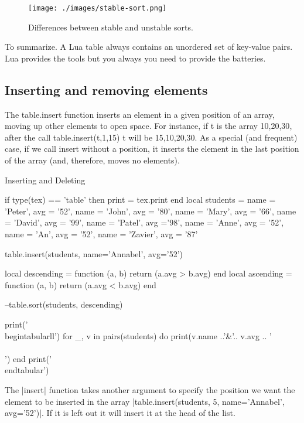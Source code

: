 \begin{figure}[htbp]
\centering

\texttt{[image: ./images/stable-sort.png]}
\caption{Differences between stable and unstable sorts.}
\end{figure}

\begin{scriptexample}{}{}
To summarize. A Lua table always contains an unordered set of key-value pairs. Lua provides the tools but you always you need to provide the batteries.
\end{scriptexample}

\subsection{Inserting and removing elements}

The table.insert function inserts an element in a given position of an array,
moving up other elements to open space. For instance, if t is the array
{10,20,30}, after the call table.insert(t,1,15) t will be {15,10,20,30}. As
a special (and frequent) case, if we call insert without a position, it inserts the
element in the last position of the array (and, therefore, moves no elements).


\begin{texexample}{Inserting and Deleting}{}
\begin{luacode}
if type(tex) == 'table' then print = tex.print end
local students = {
  {name = 'Peter', avg = '52'}, 
  {name = 'John', avg = '80'},
  {name = 'Mary', avg = '66'},
  {name = 'David', avg = '99'}, 
  {name = 'Patel', avg ='98'},
  {name = 'Anne', avg = '52'},
  {name = 'An', avg = '52'},
  {name = 'Zavier', avg = '87'} 
}

table.insert(students, {name='Annabel', avg='52'})

local descending = function (a, b) return (a.avg > b.avg) end
local ascending = function (a, b) return (a.avg < b.avg) end

--table.sort(students, descending)   

print('\\begin{tabular}{ll}')
for _, v in pairs(students) do
   print(v.name ..'&'..  v.avg .. '\\\\')
end
print('\\end{tabular}')
\end{luacode}

\end{texexample}

The |insert| function takes another argument to specify the position we want the element to be inserted in the array |table.insert(students, 5, {name='Annabel', avg='52'})|. If it is left out it will insert it at the head of the list.

